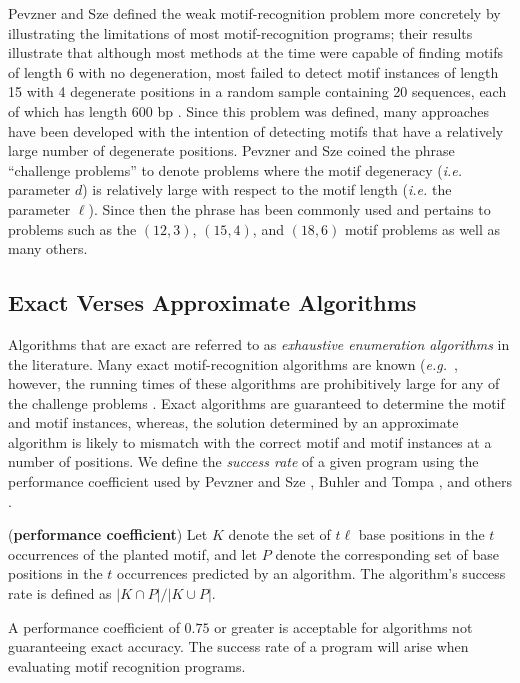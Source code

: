 Pevzner and Sze defined the weak motif-recognition problem more concretely by illustrating the limitations of most motif-recognition programs; their results illustrate that although most methods at the time were capable of finding motifs of length 6 with no degeneration, most failed to detect motif instances of length 15 with 4 degenerate positions in a random sample containing 20 sequences, each of which has length 600 bp \cite{PS00}.  Since this problem was defined, many approaches have been developed with the intention of detecting motifs that have a relatively large number of degenerate positions.  Pevzner and Sze coined the phrase ``challenge problems'' to denote problems where the motif degeneracy ({\em i.e.} parameter $d$) is relatively large with respect to the motif length ({\em i.e.} the parameter $\ell$). Since then the phrase has been commonly used and pertains to problems such as the $(12, 3)$, $(15, 4)$, and $(18, 6)$ motif problems as well as many others. 

\subsection{Exact Verses Approximate Algorithms} \label{approximate_solution_section}

Algorithms that are exact are referred to as {\em exhaustive enumeration algorithms} in the literature.  Many exact motif-recognition algorithms are known ({\em e.g.}\ \cite{BJVU98,GEW85,m83,RBH05,ST00,staden,tompa99,vHAC-V}, however, the running times of these algorithms are prohibitively large for any of the challenge problems \cite{BT02}. Exact algorithms are guaranteed to determine the motif and motif instances, whereas, the solution determined by an approximate algorithm is likely to mismatch with the correct motif and motif instances at a number of positions.  We define the {\em success rate} of a given program using the performance coefficient used by Pevzner and Sze \cite{PS00}, Buhler and Tompa \cite{BT02}, and others \cite{CL05,CL06}. 

\begin{definition} ({\bf performance coefficient}) Let $K$ denote the set of $t\ell$ base positions in the $t$ occurrences of the planted motif, and let $P$ denote the corresponding set of base positions in the $t$ occurrences predicted by an algorithm.  The algorithm's success rate is defined as $|K \cap P| / |K \cup P|$.\end{definition}

\noindent A performance coefficient of $0.75$ or greater is acceptable for algorithms not guaranteeing exact accuracy. The success rate of a program will arise when evaluating motif recognition programs. 

